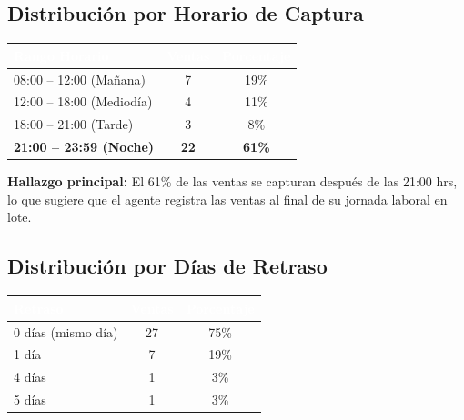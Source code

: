 \documentclass[11pt,a4paper]{article}
\begin{document}
\subsection*{Distribuci\'on por Horario de Captura}

\begin{center}
\renewcommand{\arraystretch}{1.3}
\begin{tabular}{|l|c|c|}
\hline
\rowcolor{headerblue}
\textcolor{white}{\textbf{Rango Horario}} &
\textcolor{white}{\textbf{Ventas}} &
\textcolor{white}{\textbf{Porcentaje}} \\
\hline
08:00 -- 12:00 (Ma\~nana) & 7 & 19\% \\
\hline
\rowcolor{lightgray}
12:00 -- 18:00 (Mediod\'ia) & 4 & 11\% \\
\hline
18:00 -- 21:00 (Tarde) & 3 & 8\% \\
\hline
\rowcolor{lightgray}
\textbf{21:00 -- 23:59 (Noche)} & \textbf{22} & \textbf{61\%} \\
\hline
\end{tabular}
\end{center}

\vspace{0.3cm}
\textbf{Hallazgo principal:} El 61\% de las ventas se capturan despu\'es de las 21:00 hrs, lo que sugiere que el agente registra las ventas al final de su jornada laboral en lote.

\subsection*{Distribuci\'on por D\'ias de Retraso}

\begin{center}
\renewcommand{\arraystretch}{1.3}
\begin{tabular}{|l|c|c|}
\hline
\rowcolor{headerblue}
\textcolor{white}{\textbf{Retraso}} &
\textcolor{white}{\textbf{Ventas}} &
\textcolor{white}{\textbf{Porcentaje}} \\
\hline
\textcolor{successgreen}{0 d\'ias (mismo d\'ia)} & 27 & 75\% \\
\hline
\rowcolor{lightgray}
\textcolor{warningyellow}{1 d\'ia} & 7 & 19\% \\
\hline
\textcolor{alertred}{4 d\'ias} & 1 & 3\% \\
\hline
\rowcolor{lightgray}
\textcolor{alertred}{5 d\'ias} & 1 & 3\% \\
\hline
\end{tabular}
\end{center}
\end{document}

